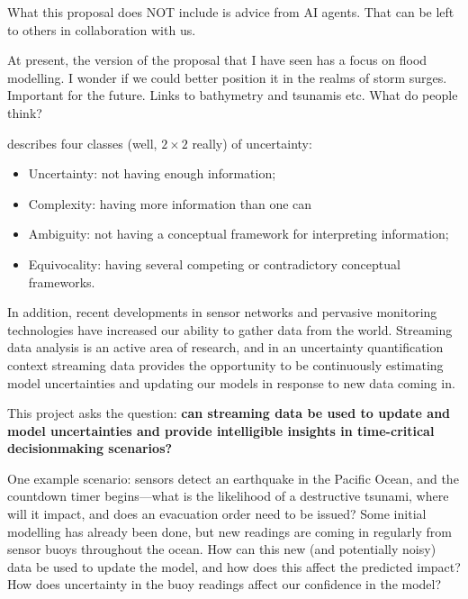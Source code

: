 \documentclass[a4paper,fontsize=12pt]{scrartcl}
\begin{document}
What this proposal does NOT include is advice from AI agents. That can
be left to others in collaboration with us.

At present, the version of the proposal that I have seen has a focus
on flood modelling. I wonder if we could better position it in the
realms of storm surges. Important for the future. Links to bathymetry
and tsunamis etc. What do people think?




\textcite{zack_role_2007} describes four classes (well, $2\times2$ really) of uncertainty:
\begin{itemize}
\item Uncertainty: not having enough information;
\item Complexity: having more information than one can
\item Ambiguity: not having a conceptual framework for interpreting
  information;
\item Equivocality: having several competing or contradictory
  conceptual frameworks.
\end{itemize}

In addition, recent developments in sensor networks and pervasive
monitoring technologies have increased our ability to gather data from
the world. Streaming data analysis is an active area of research, and
in an uncertainty quantification context streaming data provides the
opportunity to be continuously estimating model uncertainties and
updating our models in response to new data coming in.

This project asks the question: \textbf{can streaming data be used to
  update and model uncertainties and provide intelligible insights in
  time-critical decisionmaking scenarios?}

One example scenario: sensors detect an earthquake in the Pacific Ocean,
and the countdown timer begins---what is the likelihood of a
destructive tsunami, where will it impact, and does an evacuation
order need to be issued? Some initial modelling has already been done,
but new readings are coming in regularly from sensor buoys throughout
the ocean. How can this new (and potentially noisy) data be used to
update the model, and how does this affect the predicted impact? How
does uncertainty in the buoy readings affect our confidence in the
model?
\end{document}
